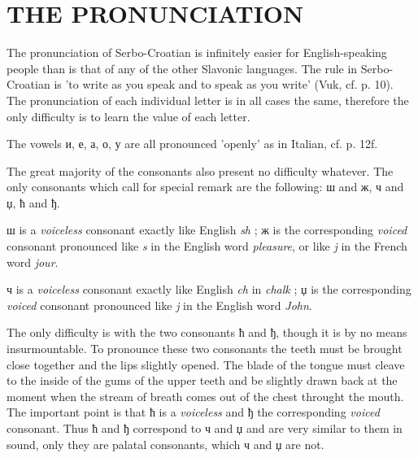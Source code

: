 \chapter{THE PRONUNCIATION}

        The pronunciation of Serbo-Croatian is infinitely easier for
        English-speaking people than is that of any of the other Slavonic
        languages. The rule in Serbo-Croatian is 'to write as you speak and to
        speak as you write' (Vuk, cf. p. 10). The pronunciation of each
        individual letter is in all cases the same, therefore the only
        difficulty is to learn the value of each letter.

        The vowels {и, е, а, о, у} are all pronounced 'openly' as
        in Italian, cf. p. 12f.

        The great majority of the consonants also present no difficulty
        whatever. The only consonants which call for special remark are the
        following: ш and ж, ч
        and џ, ћ and ђ.

        ш is a \textit{voiceless} consonant exactly like English \textit{sh}
        ; ж is the corresponding \textit{voiced} consonant pronounced
        like \textit{s} in the English word \textit{pleasure}, or like \textit{j} in
        the French word \textit{jour}.

        ч is a \textit{voiceless} consonant exactly like English
        \textit{ch} in \textit{chalk} ; џ is the corresponding
        \textit{voiced} consonant pronounced like \textit{j} in the English
        word \textit{John}.

        The only difficulty is with the two consonants ћ and
        ђ, though it is by no means insurmountable. To pronounce
        these two consonants the teeth must be brought close together and the
        lips slightly opened. The blade of the tongue
        must cleave to the inside of the gums of the upper teeth and be
        slightly drawn back at the moment when the stream of breath comes out
        of the chest throught the mouth. The important point is that
        ћ is a \textit{voiceless} and ђ the corresponding \textit{voiced}
        consonant. Thus ћ and ђ correspond to ч and џ and are very similar to
        them in sound, only they are palatal consonants, which ч and џ are not.

